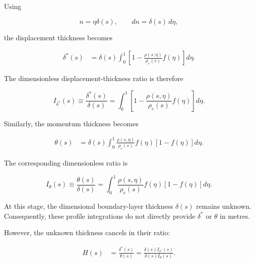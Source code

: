 Using

\begin{equation}
    n=\eta\delta(s),
    \qquad
    dn=\delta(s)\,d\eta,
\end{equation}

the displacement thickness becomes

\begin{equation}
\begin{split}
    \delta^*(s)
    &=
    \delta(s)
    \int_0^1
    \left[
        1-
        \frac{\rho(s,\eta)}{\rho_e(s)}
        f(\eta)
    \right]d\eta.
\end{split}
\label{eq:normalized_displacement_thickness}
\end{equation}

The dimensionless displacement-thickness ratio is therefore

\begin{equation}
    \boxed{
    I_{\delta^*}(s)
    \equiv
    \frac{\delta^*(s)}{\delta(s)}
    =
    \int_0^1
    \left[
        1-
        \frac{\rho(s,\eta)}{\rho_e(s)}
        f(\eta)
    \right]d\eta
    }.
    \label{eq:displacement_thickness_ratio}
\end{equation}

Similarly, the momentum thickness becomes

\begin{equation}
\begin{split}
    \theta(s)
    &=
    \delta(s)
    \int_0^1
    \frac{\rho(s,\eta)}{\rho_e(s)}
    f(\eta)
    \left[
        1-f(\eta)
    \right]d\eta.
\end{split}
\label{eq:normalized_momentum_thickness}
\end{equation}

The corresponding dimensionless ratio is

\begin{equation}
    \boxed{
    I_\theta(s)
    \equiv
    \frac{\theta(s)}{\delta(s)}
    =
    \int_0^1
    \frac{\rho(s,\eta)}{\rho_e(s)}
    f(\eta)
    \left[
        1-f(\eta)
    \right]d\eta
    }.
    \label{eq:momentum_thickness_ratio}
\end{equation}

At this stage, the dimensional boundary-layer thickness \(\delta(s)\) remains
unknown. Consequently, these profile integrations do not directly provide
\(\delta^*\) or \(\theta\) in metres.

However, the unknown thickness cancels in their ratio:

\begin{equation}
\begin{split}
    H(s)
    &=
    \frac{\delta^*(s)}{\theta(s)}
    =
    \frac{
        \delta(s)I_{\delta^*}(s)
    }{
        \delta(s)I_\theta(s)
    }.
\end{split}
\end{equation}

